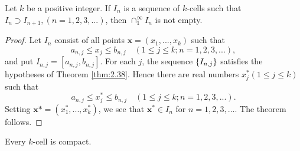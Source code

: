 \begin{thm}
    \label{thm:2.39}
    Let $k$ be a positive integer.
    If ${I_n}$ is a sequence of $k$-cells such that $I_n \supset I_{n+1}, (n=1,2,3,...)$,
    then $\cap_1^\infty I_n$ is not empty.
\end{thm}

\begin{proof}
    Let $I_n$ consist of all points $\mathbf{x} = (x_1,...,x_k)$ such that
    \begin{equation*}
        a_{n, j} \leq
        x_j \leq
        b_{n, j}
        \quad
        (1 \leq j \leq k; n = 1,2,3,...),
    \end{equation*}
    and put $I_{n,j} = [a_{n,j}, b_{n,j}]$.
    For each $j$, the sequence $\protect\{I_{n,j}\}$ satisfies the hypotheses of Theorem \ref{thm:2.38}.
    Hence there are real numbers $x_j^*(1 \leq j \leq k)$ such that
    \begin{equation*}
        a_{n,j}
        \leq x_j^* \leq
        b_{n,j}
        \quad
        (1 \leq j \leq k; n = 1, 2, 3, ... ).
    \end{equation*}
    Setting $\mathbf{x}* = (x_1^*, ... , x_k^*)$,
    we see that $\mathbf{x}^* \in I_n$ for $n = 1, 2, 3, ...$.
    The theorem follows.
\end{proof}

\begin{thm}
    \label{thm:2.40}
    Every $k$-cell is compact.
\end{thm}

